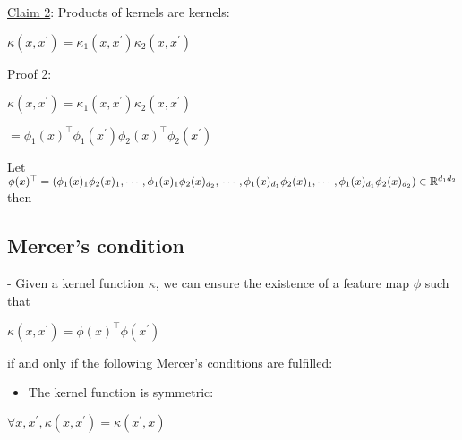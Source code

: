 \underline{Claim 2}: Products of kernels are kernels:

$
\kappa\left(x, x^{\prime}\right)=\kappa_{1}\left(x, x^{\prime}\right) \kappa_{2}\left(x, x^{\prime}\right)
$

Proof 2:

$\kappa\left(x, x^{\prime}\right)=\kappa_{1}\left(x, x^{\prime}\right) \kappa_{2}\left(x, x^{\prime}\right)$

$
=\phi_{1}(x)^{\top} \phi_{1}\left(x^{\prime}\right) \phi_{2}(x)^{\top} \phi_{2}\left(x^{\prime}\right)
$

Let 
$\phi(x)^{\top} = (\phi_{1}(x)_{1}\phi_{2}(x)_{1}, \cdots, \phi_{1}(x)_{1}\phi_{2}(x)_{d_{2}}, \\\cdots,
\phi_{1}(x)_{d_{1}}\phi_{2}(x)_{1}, \cdots, \phi_{1}(x)_{d_{1}}\phi_{2}(x)_{d_{2}}) \in \mathbb{R}^{d_{1} d_{2}}$
then


\subsection*{Mercer's condition}
- Given a kernel function $\kappa$, we can ensure the existence of a feature map $\phi$ such that

$
\kappa\left(x, x^{\prime}\right)=\phi(x)^{\top} \phi\left(x^{\prime}\right)
$

if and only if the following Mercer's conditions are fulfilled:

\begin{itemize}
  \item The kernel function is symmetric:
\end{itemize}

$
\forall x, x^{\prime}, \kappa\left(x, x^{\prime}\right)=\kappa\left(x^{\prime}, x\right)
$

